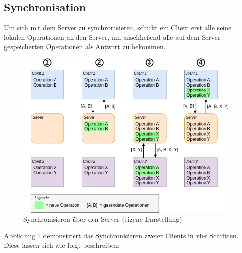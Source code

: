 \documentclass[a4paper, 12pt]{scrreprt}
\begin{document}
\subsection{Synchronisation}

Um sich mit dem Server zu synchronisieren, schickt ein Client erst alle seine lokalen Operationen an den Server, um anschließend alle auf dem Server gespeicherten Operationen als Antwort zu bekommen.

\begin{figure}[H]
	\centering
	\includegraphics[width=1\textwidth]{syncDiagram2.png}
	\caption[Synchronisieren über den Server]{Synchronisieren über den Server (eigene Darstellung)}
	\label{fig:syncDiagram}
\end{figure}

Abbildung \ref{fig:syncDiagram} demonstriert das Synchronisieren zweier Clients in vier Schritten. Diese lassen sich wie folgt beschreiben:
\end{document}
